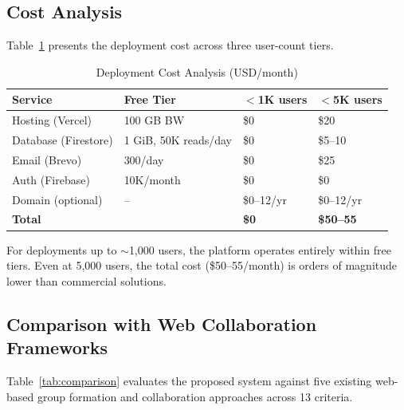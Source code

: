 \documentclass[11pt,a4paper]{article}
\theoremstyle{plain}
\theoremstyle{definition}
\begin{document}
\subsection{Cost Analysis}

Table~\ref{tab:cost} presents the deployment cost across three user-count tiers.

\begin{table}[htbp]
\centering
\caption{Deployment Cost Analysis (USD/month)}
\label{tab:cost}
\small
\renewcommand{\arraystretch}{1.15}
\begin{tabular}{@{}llll@{}}
\toprule
\textbf{Service} & \textbf{Free Tier} & $<$\textbf{1K users} & $<$\textbf{5K users} \\
\midrule
Hosting (Vercel) & 100 GB BW & \$0 & \$20 \\
Database (Firestore) & 1 GiB, 50K reads/day & \$0 & \$5--10 \\
Email (Brevo) & 300/day & \$0 & \$25 \\
Auth (Firebase) & 10K/month & \$0 & \$0 \\
Domain (optional) & -- & \$0--12/yr & \$0--12/yr \\
\midrule
\textbf{Total} & & \textbf{\$0} & \textbf{\$50--55} \\
\bottomrule
\end{tabular}
\end{table}

For deployments up to $\sim$1,000 users, the platform operates entirely within free tiers. Even at 5,000 users, the total cost (\$50--55/month) is orders of magnitude lower than commercial solutions.

\subsection{Comparison with Web Collaboration Frameworks}

Table~\ref{tab:comparison} evaluates the proposed system against five existing web-based group formation and collaboration approaches across 13 criteria.
\end{document}
